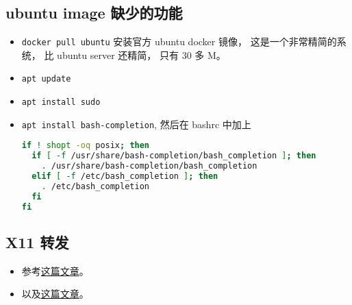 \subsection{ubuntu image 缺少的功能}
\begin{itemize}
\item \verb|docker pull ubuntu| 安装官方 ubuntu docker 镜像， 这是一个非常精简的系统， 比 ubuntu server 还精简， 只有 30 多 M。
\item \verb|apt update|
\item \verb`apt install sudo`
\item \verb`apt install bash-completion`, 然后在 bashrc 中加上
\begin{lstlisting}[language=bash]
if ! shopt -oq posix; then
  if [ -f /usr/share/bash-completion/bash_completion ]; then
    . /usr/share/bash-completion/bash_completion
  elif [ -f /etc/bash_completion ]; then
    . /etc/bash_completion
  fi
fi
\end{lstlisting}
\end{itemize}

\subsection{X11 转发}
\begin{itemize}
\item 参考\href{https://opendata-forum.cern.ch/t/x11-forwarding-with-docker/31}{这篇文章}。
\item 以及\href{https://www.howtogeek.com/devops/how-to-run-gui-applications-in-a-docker-container/}{这篇文章}。
\end{itemize}
